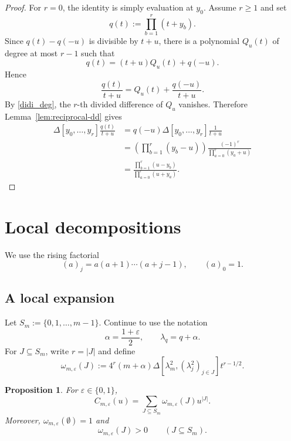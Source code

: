 \documentclass[12pt]{amsart}
\newtheorem{Proposition}[Theorem]{Proposition}
\theoremstyle{definition}
\newcommand{\DD}{\Delta}
\begin{document}
\begin{proof}
For $r=0$, the identity is simply evaluation at $y_0$.  Assume $r\ge1$ and set
\[
q(t):=\prod_{b=1}^r(t+y_b).
\]
Since $q(t)-q(-u)$ is divisible by $t+u$, there is a polynomial $Q_u(t)$
of degree at most $r-1$ such that
\[
q(t)=(t+u)Q_u(t)+q(-u).
\]
Hence
\[
\frac{q(t)}{t+u}
=
Q_u(t)+\frac{q(-u)}{t+u}.
\]
By \eqref{didi_deg}, the $r$-th divided difference of $Q_u$ vanishes.  Therefore
Lemma~\ref{lem:reciprocal-dd} gives
\[
\begin{aligned}
\DD[y_0,\ldots,y_r]\frac{q(t)}{t+u}
&=q(-u)\DD[y_0,\ldots,y_r]\frac1{t+u}\\
&=\left(\prod_{b=1}^r(y_b-u)\right)
\frac{(-1)^r}{\prod_{a=0}^r(y_a+u)}\\
&=\frac{\prod_{b=1}^r(u-y_b)}{\prod_{a=0}^r(u+y_a)}.
\end{aligned}
\]
\end{proof}



\section{Local decompositions}\label{sec:local-expansion}

We use the rising factorial
\[
(a)_j=a(a+1)\cdots(a+j-1),
\qquad
(a)_0=1.
\]

\subsection{A local expansion}

Let $S_m:=\{0,1,\ldots,m-1\}$.
Continue to use the notation
\[
\alpha=\frac{1+\varepsilon}{2},
\qquad
\lambda_q=q+\alpha.
\]
For $J\subseteq S_m$, write $r=|J|$ and define
\begin{equation}\label{eq:parity-weight}
\omega_{m,\varepsilon}(J)
:=
4^r(m+\alpha)
\DD[\lambda_m^2,(\lambda_j^2)_{j\in J}]
t^{r-1/2}.
\end{equation}

\begin{Proposition}\label{prop:unified-local-expansion}
For $\varepsilon\in\{0,1\}$,
\[
C_{m,\varepsilon}(u)
=
\sum_{J\subseteq S_m}
\omega_{m,\varepsilon}(J)u^{|J|}.
\]
Moreover, $\omega_{m,\varepsilon}(\emptyset)=1$
and
\[
\omega_{m,\varepsilon}(J)>0
\qquad
(J\subseteq S_m).
\]
\end{Proposition}
\end{document}
